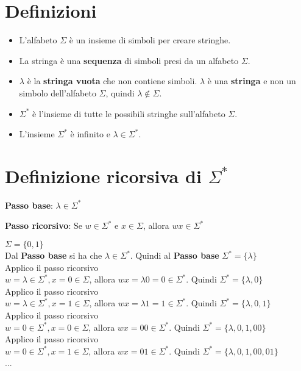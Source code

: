 \section{Definizioni}
\begin{itemize}
    \item L'alfabeto $\Sigma$ è un insieme di simboli per creare stringhe.
    \item La stringa è una \textbf{sequenza} di simboli presi da un alfabeto $\Sigma$.
    \item $\lambda$ è la \textbf{stringa vuota} che non contiene simboli. $\lambda$ è una \textbf{stringa} e non un simbolo dell'alfabeto $\Sigma$, quindi $\lambda \not\in \Sigma$.
    \item $\Sigma^*$ è l'insieme di tutte le possibili stringhe sull'alfabeto $\Sigma$.
    \item L'insieme $\Sigma^*$ è infinito e $\lambda \in \Sigma^*$.
\end{itemize}

\section{Definizione ricorsiva di $\Sigma^*$}
\textbf{Passo base}: $\lambda \in \Sigma^*$

\textbf{Passo ricorsivo}: Se $w \in \Sigma^*$ e $x \in \Sigma$, allora $wx \in \Sigma^*$
\begin{example}
$\Sigma = \{0, 1\}$ \\
Dal \textbf{Passo base} si ha che $\lambda \in \Sigma^*$. Quindi al \textbf{Passo base} $\Sigma^*=\{\lambda\}$ \\
Applico il passo ricorsivo \\
$w = \lambda \in \Sigma^*, x = 0 \in \Sigma$, allora $wx = \lambda 0 = 0 \in \Sigma^*$. Quindi $\Sigma^*=\{\lambda, 0\}$ \\
Applico il passo ricorsivo \\
$w = \lambda \in \Sigma^*, x = 1 \in \Sigma$, allora $wx = \lambda 1 = 1 \in \Sigma^*$. Quindi $\Sigma^*=\{\lambda, 0, 1\}$ \\
Applico il passo ricorsivo \\
$w = 0 \in \Sigma^*, x = 0 \in \Sigma$, allora $wx = 00 \in \Sigma^*$. Quindi $\Sigma^*=\{\lambda, 0, 1, 00\}$ \\
Applico il passo ricorsivo \\
$w = 0 \in \Sigma^*, x = 1 \in \Sigma$, allora $wx = 01 \in \Sigma^*$. Quindi $\Sigma^*=\{\lambda, 0, 1, 00, 01\}$ \\
...
\end{example}

